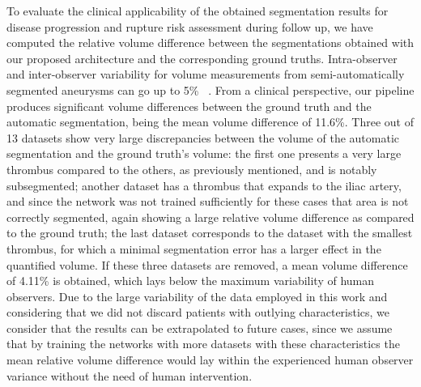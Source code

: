 \documentclass[preprint,authoryear,12pt]{elsarticle}
\begin{document}
To evaluate the clinical applicability of the obtained segmentation results for disease progression and rupture risk assessment during follow up, we have computed the relative volume difference between the segmentations obtained with our proposed architecture and the corresponding ground truths. %
Intra-observer and inter-observer variability for volume measurements from semi-automatically segmented aneurysms can go up to 5\% ~\citep{Cha02,parr11,van08}. From a clinical perspective, our pipeline produces significant volume differences between the ground truth and the automatic segmentation, being the mean volume difference of 11.6\%. Three out of 13 datasets show very large discrepancies between the volume of the automatic segmentation and the ground truth's volume: the first one presents a very large thrombus compared to the others, as previously mentioned, and is notably subsegmented; another dataset has a thrombus that expands to the iliac artery, and since the network was not trained sufficiently for these cases that area is not correctly segmented, again showing a large relative volume difference as compared to the ground truth; the last dataset corresponds to the dataset with the smallest thrombus, for which a minimal segmentation error has a larger effect in the quantified volume. If these three datasets are removed, a mean volume difference of 4.11\% is obtained, which lays below the maximum variability of human observers. Due to the large variability of the data employed in this work and considering that we did not discard patients with outlying characteristics, we consider that the results can be extrapolated to future cases, since we assume that by training the networks with more datasets with these characteristics the mean relative volume difference would lay within the experienced human observer variance without the need of human intervention. 
\end{document}
